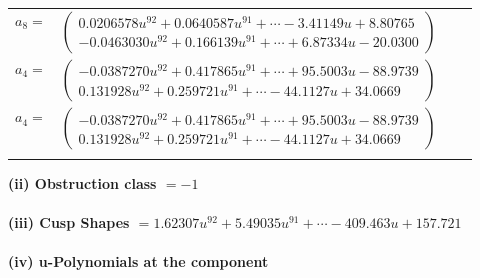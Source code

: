 \documentclass[1p]{elsarticle_modified}
\theoremstyle{definition}
\begin{document}
\begin{tabular}{m{7pt} m{180pt} m{7pt} m{180pt} }
\flushright $a_{8}=$&$\begin{pmatrix}0.0206578 u^{92}+0.0640587 u^{91}+\cdots-3.41149 u+8.80765\\-0.0463030 u^{92}+0.166139 u^{91}+\cdots+6.87334 u-20.0300\end{pmatrix}$ \\
\flushright $a_{4}=$&$\begin{pmatrix}-0.0387270 u^{92}+0.417865 u^{91}+\cdots+95.5003 u-88.9739\\0.131928 u^{92}+0.259721 u^{91}+\cdots-44.1127 u+34.0669\end{pmatrix}$\\ \flushright $a_{4}=$&$\begin{pmatrix}-0.0387270 u^{92}+0.417865 u^{91}+\cdots+95.5003 u-88.9739\\0.131928 u^{92}+0.259721 u^{91}+\cdots-44.1127 u+34.0669\end{pmatrix}$\\&\end{tabular}
\flushleft \textbf{(ii) Obstruction class $= -1$}\\~\\
\flushleft \textbf{(iii) Cusp Shapes $= 1.62307 u^{92}+5.49035 u^{91}+\cdots-409.463 u+157.721$}\\~\\
\newpage\renewcommand{\arraystretch}{1}
\flushleft \textbf{(iv) u-Polynomials at the component}\newline \\
\end{document}
